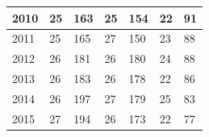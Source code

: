 \begin{table}[H]
\begin{tabular}{lllllll}
		\multicolumn{1}{|l|}{2010}                                  & \multicolumn{1}{l|}{25}                                        & \multicolumn{1}{l|}{163}                                      & \multicolumn{1}{l|}{25}                                        & \multicolumn{1}{l|}{154}                                      & \multicolumn{1}{l|}{22}                                        & \multicolumn{1}{l|}{91}                                       \\ \hline
		\multicolumn{1}{|l|}{2011}                                  & \multicolumn{1}{l|}{25}                                        & \multicolumn{1}{l|}{165}                                      & \multicolumn{1}{l|}{27}                                        & \multicolumn{1}{l|}{150}                                      & \multicolumn{1}{l|}{23}                                        & \multicolumn{1}{l|}{88}                                       \\ \hline
		\multicolumn{1}{|l|}{2012}                                  & \multicolumn{1}{l|}{26}                                        & \multicolumn{1}{l|}{181}                                      & \multicolumn{1}{l|}{26}                                        & \multicolumn{1}{l|}{180}                                      & \multicolumn{1}{l|}{24}                                        & \multicolumn{1}{l|}{88}                                       \\ \hline
		\multicolumn{1}{|l|}{2013}                                  & \multicolumn{1}{l|}{26}                                        & \multicolumn{1}{l|}{183}                                      & \multicolumn{1}{l|}{26}                                        & \multicolumn{1}{l|}{178}                                      & \multicolumn{1}{l|}{22}                                        & \multicolumn{1}{l|}{86}                                       \\ \hline
		\multicolumn{1}{|l|}{2014}                                  & \multicolumn{1}{l|}{26}                                        & \multicolumn{1}{l|}{197}                                      & \multicolumn{1}{l|}{27}                                        & \multicolumn{1}{l|}{179}                                      & \multicolumn{1}{l|}{25}                                        & \multicolumn{1}{l|}{83}                                       \\ \hline
		\multicolumn{1}{|l|}{2015}                                  & \multicolumn{1}{l|}{27}                                        & \multicolumn{1}{l|}{194}                                      & \multicolumn{1}{l|}{26}                                        & \multicolumn{1}{l|}{173}                                      & \multicolumn{1}{l|}{22}                                        & \multicolumn{1}{l|}{77}                                       \\ \hline

\end{tabular}
\end{table}
